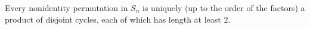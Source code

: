 \begin{theorem}
Every nonidentity permutation in $S_n$ is uniquely (up to the order of the factors) a product of disjoint cycles, each of which has length at least 2.
\end{theorem}
